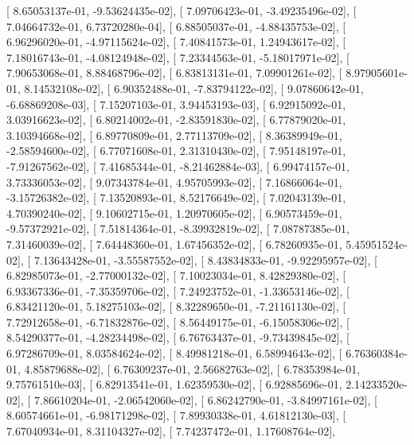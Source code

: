 \documentclass{article}
\begin{document}
       [  8.65053137e-01,  -9.53624435e-02],
       [  7.09706423e-01,  -3.49235496e-02],
       [  7.04664732e-01,   6.73720280e-04],
       [  6.88505037e-01,  -4.88435753e-02],
       [  6.96296020e-01,  -4.97115624e-02],
       [  7.40841573e-01,   1.24943617e-02],
       [  7.18016743e-01,  -4.08124948e-02],
       [  7.23344563e-01,  -5.18017971e-02],
       [  7.90653068e-01,   8.88468796e-02],
       [  6.83813131e-01,   7.09901261e-02],
       [  8.97905601e-01,   8.14532108e-02],
       [  6.90352488e-01,  -7.83794122e-02],
       [  9.07860642e-01,  -6.68869208e-03],
       [  7.15207103e-01,   3.94453193e-03],
       [  6.92915092e-01,   3.03916623e-02],
       [  6.80214002e-01,  -2.83591830e-02],
       [  6.77879020e-01,   3.10394668e-02],
       [  6.89770809e-01,   2.77113709e-02],
       [  8.36389949e-01,  -2.58594600e-02],
       [  6.77071608e-01,   2.31310430e-02],
       [  7.95148197e-01,  -7.91267562e-02],
       [  7.41685344e-01,  -8.21462884e-03],
       [  6.99474157e-01,   3.73336053e-02],
       [  9.07343784e-01,   4.95705993e-02],
       [  7.16866064e-01,  -3.15726382e-02],
       [  7.13520893e-01,   8.52176649e-02],
       [  7.02043139e-01,   4.70390240e-02],
       [  9.10602715e-01,   1.20970605e-02],
       [  6.90573459e-01,  -9.57372921e-02],
       [  7.51814364e-01,  -8.39932819e-02],
       [  7.08787385e-01,   7.31460039e-02],
       [  7.64448360e-01,   1.67456352e-02],
       [  6.78260935e-01,   5.45951524e-02],
       [  7.13643428e-01,  -3.55587552e-02],
       [  8.43834833e-01,  -9.92295957e-02],
       [  6.82985073e-01,  -2.77000132e-02],
       [  7.10023034e-01,   8.42829380e-02],
       [  6.93367336e-01,  -7.35359706e-02],
       [  7.24923752e-01,  -1.33653146e-02],
       [  6.83421120e-01,   5.18275103e-02],
       [  8.32289650e-01,  -7.21161130e-02],
       [  7.72912658e-01,  -6.71832876e-02],
       [  8.56449175e-01,  -6.15058306e-02],
       [  8.54290377e-01,  -4.28234498e-02],
       [  6.76763437e-01,  -9.73439845e-02],
       [  6.97286709e-01,   8.03584624e-02],
       [  8.49981218e-01,   6.58994643e-02],
       [  6.76360384e-01,   4.85879688e-02],
       [  6.76309237e-01,   2.56682763e-02],
       [  6.78353984e-01,   9.75761510e-03],
       [  6.82913541e-01,   1.62359530e-02],
       [  6.92885696e-01,   2.14233520e-02],
       [  7.86610204e-01,  -2.06542060e-02],
       [  6.86242790e-01,  -3.84997161e-02],
       [  8.60574661e-01,  -6.98171298e-02],
       [  7.89930338e-01,   4.61812130e-03],
       [  7.67040934e-01,   8.31104327e-02],
       [  7.74237472e-01,   1.17608764e-02],
\end{document}
